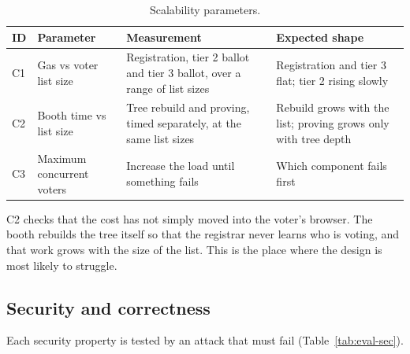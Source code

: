 \begin{table}[htbp]
  \centering
  \caption{Scalability parameters.}
  \label{tab:eval-scale}
  \small
  \begin{tabular}{@{}lL{4.3cm}L{5.0cm}L{5.0cm}@{}}
    \toprule
    \textbf{ID} & \textbf{Parameter}        & \textbf{Measurement}                                             & \textbf{Expected shape} \\
    \midrule
    C1          & Gas vs voter list size    & Registration, tier 2 ballot and tier 3 ballot, over a range of list sizes & Registration and tier 3 flat; tier 2 rising slowly \\
    C2          & Booth time vs list size   & Tree rebuild and proving, timed separately, at the same list sizes & Rebuild grows with the list; proving grows only with tree depth \\
    C3          & Maximum concurrent voters & Increase the load until something fails                          & Which component fails first \\
    \bottomrule
  \end{tabular}
\end{table}

C2 checks that the cost has not simply moved into the voter's browser. The
booth rebuilds the tree itself so that the registrar never learns who is
voting, and that work grows with the size of the list. This is the place where
the design is most likely to struggle.

\subsection{Security and correctness}

Each security property is tested by an attack that must fail
(Table~\ref{tab:eval-sec}).


